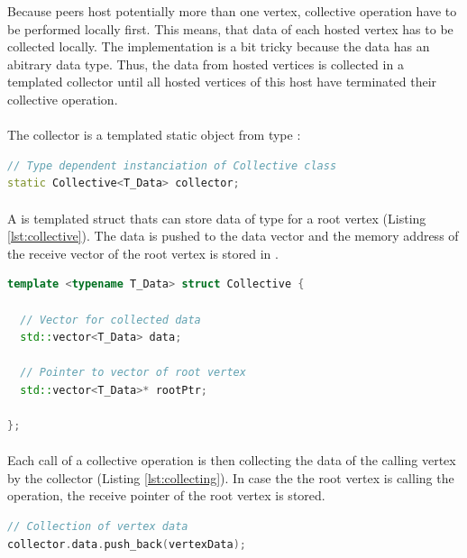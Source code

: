 Because peers host potentially more than one vertex, collective
operation have to be performed locally first. This means, that data of
each hosted vertex has to be collected locally.  The implementation is
a bit tricky because the data has an abitrary data type. Thus, the
data from hosted vertices is collected in a templated collector until
all hosted vertices of this host have terminated their collective
operation.

\paragraph*{}
The collector is a templated static object from type :
\begin{lstlisting}[language=C++, label=lst:static_collective]
// Type dependent instanciation of Collective class
static Collective<T_Data> collector;
\end{lstlisting}

\paragraph*{}
A  is templated struct thats can store data of type
 for a root vertex (Listing \ref{lst:collective}). The data is
pushed to the data vector and the memory address of the receive vector
of the root vertex is stored in .
\begin{lstlisting}[language=C++, label=lst:collective]
template <typename T_Data> struct Collective { 

  // Vector for collected data
  std::vector<T_Data> data; 

  // Pointer to vector of root vertex
  std::vector<T_Data>* rootPtr; 

};
\end{lstlisting}

\paragraph*{}
Each call of a collective operation is then collecting the data of the
calling vertex by the collector (Listing \ref{lst:collecting}).  In
case the the root vertex is calling the operation, the receive pointer
of the root vertex is stored.
\begin{lstlisting}[language=C++, label=lst:collecting]
// Collection of vertex data
collector.data.push_back(vertexData);
\end{lstlisting}

